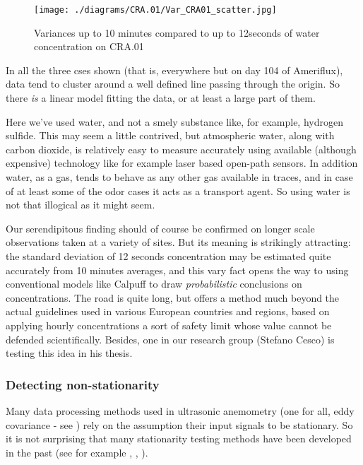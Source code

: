 \documentclass[a4paper,10pt]{book}
\begin{document}
\begin{figure}[htp]
 \centering
 \begin{center}
 \texttt{[image: ./diagrams/CRA.01/Var\_CRA01\_scatter.jpg]}
 \end{center}
 \caption{Variances up to 10 minutes compared to up to 12seconds of water concentration on CRA.01}
 \label{fig:CRA.01.Scatter}
\end{figure}

In all the three cses shown (that is, everywhere but on day 104 of Ameriflux), data tend to cluster around a well defined line passing through the origin. So there \emph{is} a linear model fitting the data, or at least a large part of them.

Here we've used water, and not a smely substance like, for example, hydrogen sulfide. This may seem a little contrived, but atmospheric water, along with carbon dioxide, is relatively easy to measure accurately using available (although expensive) technology like for example laser based open-path sensors. In addition water, as a gas, tends to behave as any other gas available in traces, and in case of at least some of the odor cases it acts as a transport agent. So using water is not that illogical as it might seem.

Our serendipitous finding should of course be confirmed on longer scale observations taken at a variety of sites. But its meaning is strikingly attracting: the standard deviation of 12 seconds concentration may be estimated quite accurately from 10 minutes averages, and this vary fact opens the way to using conventional models like Calpuff to draw \emph{probabilistic} conclusions on concentrations. The road is quite long, but offers a method much beyond the actual guidelines used in various European countries and regions, based on applying hourly concentrations a sort of safety limit whose value cannot be defended scientifically. Besides, one in our research group (Stefano Cesco) is testing this idea in his thesis.


\subsubsection{Detecting non-stationarity}

Many data processing methods used in ultrasonic anemometry (one for all, eddy covariance - see \cite{Aubinet2012}) rely on the assumption their input signals to be stationary. So it is not surprising that many stationarity testing methods have been developed in the past (see for example \cite{Vickers1997}, \cite{Aubinet2012}, \cite{Foken1996}).
\end{document}
